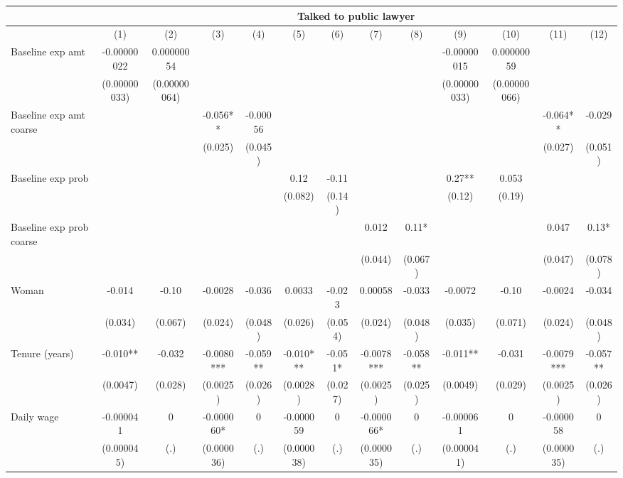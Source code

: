 \begin{tabular}{lcccccccccccc}
\toprule
      & \multicolumn{12}{c}{Talked to public lawyer} \\
\midrule
\midrule
      & (1)   & (2)   & (3)   & (4)   & (5)   & (6)   & (7)   & (8)   & (9)   & (10)  & (11)  & (12) \\
\midrule
\midrule
Baseline exp amt & -0.00000022 & 0.00000054 &       &       &       &       &       &       & -0.00000015 & 0.00000059 &       &  \\
      & (0.00000033) & (0.00000064) &       &       &       &       &       &       & (0.00000033) & (0.00000066) &       &  \\
Baseline exp amt coarse &       &       & -0.056** & -0.00056 &       &       &       &       &       &       & -0.064** & -0.029 \\
      &       &       & (0.025) & (0.045) &       &       &       &       &       &       & (0.027) & (0.051) \\
Baseline exp prob &       &       &       &       & 0.12  & -0.11 &       &       & 0.27** & 0.053 &       &  \\
      &       &       &       &       & (0.082) & (0.14) &       &       & (0.12) & (0.19) &       &  \\
Baseline exp prob coarse &       &       &       &       &       &       & 0.012 & 0.11* &       &       & 0.047 & 0.13* \\
      &       &       &       &       &       &       & (0.044) & (0.067) &       &       & (0.047) & (0.078) \\
Woman & -0.014 & -0.10 & -0.0028 & -0.036 & 0.0033 & -0.023 & 0.00058 & -0.033 & -0.0072 & -0.10 & -0.0024 & -0.034 \\
      & (0.034) & (0.067) & (0.024) & (0.048) & (0.026) & (0.054) & (0.024) & (0.048) & (0.035) & (0.071) & (0.024) & (0.048) \\
Tenure (years) & -0.010** & -0.032 & -0.0080*** & -0.059** & -0.010*** & -0.051* & -0.0078*** & -0.058** & -0.011** & -0.031 & -0.0079*** & -0.057** \\
      & (0.0047) & (0.028) & (0.0025) & (0.026) & (0.0028) & (0.027) & (0.0025) & (0.025) & (0.0049) & (0.029) & (0.0025) & (0.026) \\
Daily wage & -0.000041 & 0     & -0.000060* & 0     & -0.000059 & 0     & -0.000066* & 0     & -0.000061 & 0     & -0.000058 & 0 \\
      & (0.000045) & (.)   & (0.000036) & (.)   & (0.000038) & (.)   & (0.000035) & (.)   & (0.000041) & (.)   & (0.000035) & (.) \\

\end{tabular}
